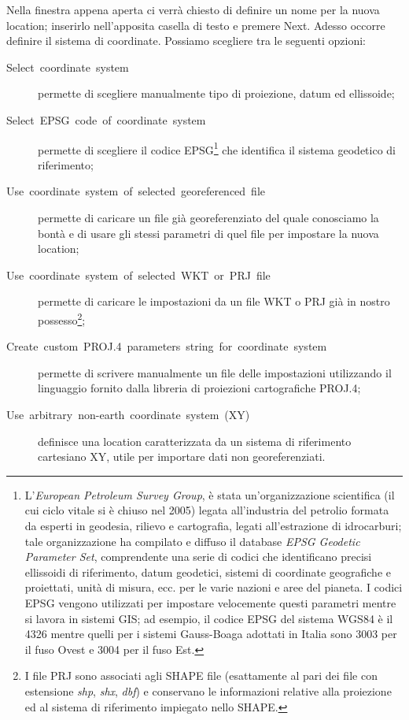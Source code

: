 				Nella finestra appena aperta ci verrà chiesto di definire un nome per la nuova location; inserirlo nell'apposita casella di testo e premere \textsf{Next}. Adesso occorre definire il sistema di coordinate.  Possiamo scegliere tra le seguenti opzioni:
				
				\begin{description}
					\item [{\textsf{Select~coordinate~system}}] permette di scegliere manualmente tipo di proiezione, datum ed ellissoide;
					\item [{\textsf{Select~EPSG~code~of~coordinate~system}}] permette di scegliere il codice EPSG\footnote{L'\emph{European Petroleum Survey Group}, è stata un'organizzazione scientifica (il cui ciclo vitale si è chiuso nel 2005) legata all'industria del petrolio formata da esperti in geodesia, rilievo e cartografia, legati all'estrazione di idrocarburi; tale organizzazione ha compilato e diffuso il database \emph{EPSG Geodetic Parameter Set}, comprendente una serie di codici che identificano precisi ellissoidi di riferimento, datum geodetici, sistemi di coordinate geografiche e proiettati, unità di misura, ecc. per le varie nazioni e aree del pianeta. I codici EPSG vengono utilizzati per impostare velocemente questi parametri mentre si lavora in sistemi GIS; ad esempio, il codice EPSG del sistema WGS84 è il 4326 mentre quelli per i sistemi Gauss-Boaga adottati in Italia sono 3003 per il fuso Ovest e 3004 per il fuso Est.} che identifica il sistema geodetico di riferimento;
					\item [{\textsf{Use~coordinate~system~of~selected~georeferenced~file}}] permette di caricare un file già georeferenziato del quale conosciamo la bontà e di usare gli stessi parametri di quel file per impostare la nuova location;
					\item [{\textsf{Use~coordinate~system~of~selected~WKT~or~PRJ~file}}] permette di caricare le impostazioni da un file WKT o PRJ già in nostro possesso\footnote{I file PRJ sono associati agli SHAPE file (esattamente al pari dei file con estensione \emph{shp}, \emph{shx}, \emph{dbf}) e conservano le informazioni relative alla proiezione ed al sistema di riferimento impiegato nello SHAPE.};
					\item [{\textsf{Create~custom~PROJ.4~parameters~string~for~coordinate~system}}] permette di scrivere manualmente un file delle impostazioni utilizzando il linguaggio fornito dalla libreria di proiezioni cartografiche PROJ.4;
					\item [{\textsf{Use~arbitrary~non-earth~coordinate~system~(XY)}}] definisce una location caratterizzata da un sistema di riferimento cartesiano XY, utile per importare dati non georeferenziati.
				\end{description}
				
